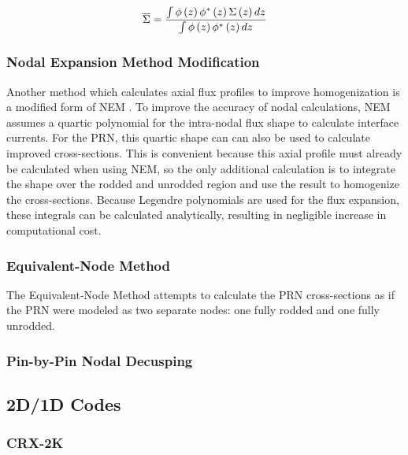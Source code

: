 \begin{equation}\label{e:bilinearWeighting}
\overline{\Sigma} = \frac{\intop \phi\left(z\right) \phi^*\left(z\right) \Sigma\left(z\right) dz}{\intop \phi\left(z\right) \phi^*\left(z\right) dz}
\end{equation}

\subsubsection{Nodal Expansion Method Modification}\label{sss:NEMmod}

Another method which calculates axial flux profiles to improve homogenization is a modified form of NEM \cite{de2012NEMmodification,martinez1999NEMmodOrig}.  To improve the accuracy of nodal calculations, NEM assumes a quartic polynomial for the intra-nodal flux shape to calculate interface currents.  For the PRN, this quartic shape can can also be used to calculate improved cross-sections.  This is convenient because this axial profile must already be calculated when using NEM, so the only additional calculation is to integrate the shape over the rodded and unrodded region and use the result to homogenize the cross-sections.  Because Legendre polynomials are used for the flux expansion, these integrals can be calculated analytically, resulting in negligible increase in computational cost.

\subsubsection{Equivalent-Node Method}

The Equivalent-Node Method \cite{dall2002nodeEquivalenceDecusping} attempts to calculate the PRN cross-sections as if the PRN were modeled as two separate nodes: one fully rodded and one fully unrodded.

\subsubsection{Pin-by-Pin Nodal Decusping}

\cite{yamamoto2004pinByPinNodalDecusping}

\subsection{2D/1D Codes}\label{ss:2d1d-old-decusping-methods}

\subsubsection{CRX-2K}

